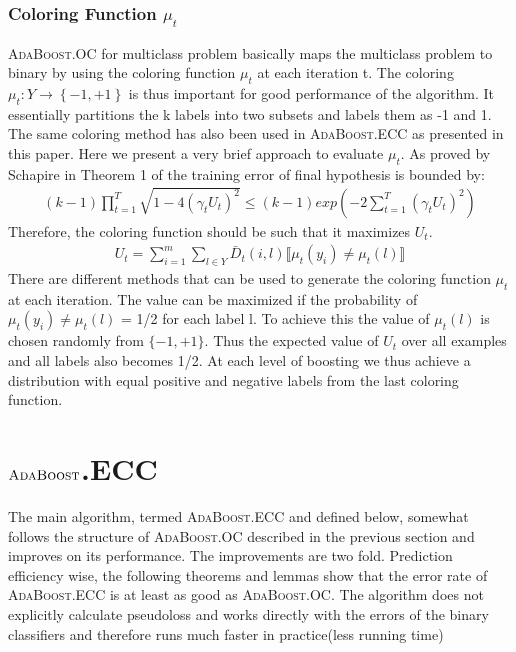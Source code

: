 \documentclass[11pt]{article}
\begin{document}
\subsubsection{Coloring Function $\mu_t$}
\textsc{AdaBoost}.OC for multiclass problem basically maps the multiclass problem to binary by using the coloring function $\mu_t$ at each iteration t.  The coloring $\mu_t: Y \to \left\{-1,+1\right\}$ is thus important for good performance of the algorithm. It essentially partitions the k labels into two subsets and labels them as -1 and 1. The same coloring method has also been used in \textsc{AdaBoost}.ECC as presented in this paper. Here we present a very brief approach to evaluate $\mu_t$. As proved by Schapire in Theorem 1 of \cite{s-ocbmlp-97} the training error of final hypothesis is bounded by:
\begin{align*}
    (k-1) \prod_{t=1}^T \sqrt{1-4(\gamma_t U_t)^2} \leq (k-1)exp\left(-2 \sum_{t=1}^T (\gamma_t U_t)^2\right)
\end{align*}
Therefore, the coloring function should be such that it maximizes $U_t$.
\begin{align*}
    U_t = \sum_{i=1}^m \sum_{l \in Y} \bar D_t(i,l) \llbracket \mu_t(y_i) \neq \mu_t(l)\rrbracket
\end{align*}
There are different methods that can be used to generate the coloring function $\mu_t$ at each iteration. The value can be maximized if the probability of $\mu_t(y_i) \neq \mu_t(l)$ = 1/2 for each label l. To achieve this the value of $\mu_t(l)$ is chosen randomly from $\{-1,+1\}$. Thus the expected value of $U_t$ over all examples and all labels also becomes 1/2. At each level of boosting we thus achieve a distribution with equal positive and negative labels from the last coloring function.

\section{$\textsc{AdaBoost}$.ECC}
The main algorithm, termed \textsc{AdaBoost}.ECC and defined below, somewhat follows the structure of \textsc{AdaBoost}.OC described in the previous section and improves on its performance. The improvements are two fold.
Prediction efficiency wise, the following theorems and lemmas show that the error rate of \textsc{AdaBoost}.ECC is at least as good as \textsc{AdaBoost}.OC.
The algorithm does not explicitly calculate pseudoloss and works directly with the errors of the binary classifiers and therefore runs much faster in practice(less running time)
\end{document}
